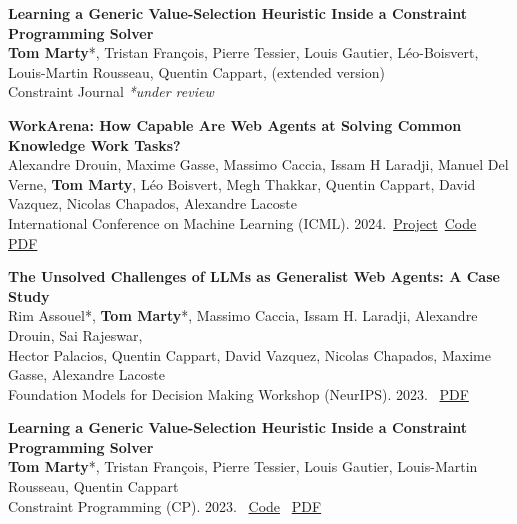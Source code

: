 \documentclass[letterpaper,11pt]{article}
\begin{document}
\begin{tcolorbox}[enhanced, sharp corners, colback=white, colframe=black!10!white, boxrule=0.5mm, left=10pt, right=10pt, top=6pt, bottom=3pt]
    \textbf{Learning a Generic Value-Selection Heuristic Inside a Constraint Programming Solver} \\
    \textbf{Tom Marty}*, Tristan François, Pierre Tessier, Louis Gautier, Léo-Boisvert, Louis-Martin Rousseau, Quentin Cappart, (extended version)\\
    Constraint Journal \hfill \textit{*under review} 
\end{tcolorbox}

\begin{tcolorbox}[enhanced, sharp corners, colback=white, colframe=black!10!white, boxrule=0.5mm, left=10pt, right=10pt, top=6pt, bottom=3pt]
    \textbf{WorkArena: How Capable Are Web Agents at Solving Common Knowledge Work Tasks?} \\
    Alexandre Drouin, Maxime Gasse, Massimo Caccia, Issam H Laradji, Manuel Del Verne, \textbf{Tom Marty}, Léo Boisvert, Megh Thakkar, Quentin Cappart, David Vazquez, Nicolas Chapados, Alexandre Lacoste \\
    International Conference on Machine Learning (ICML). 2024.  \hfill
\faLink \,\href{https://servicenow.github.io/WorkArena/}{Project}\quad \faCode\, \href{https://github.com/corail-research/SeaPearl.jl}{Code}\quad \faFilePdf \, \href{https://openreview.net/forum?id=jt3il4fC5B}{PDF}
\end{tcolorbox}

\begin{tcolorbox}[enhanced, sharp corners, colback=white, colframe=black!10!white, boxrule=0.5mm, left=10pt, right=10pt, top=6pt, bottom=3pt]
    \textbf{The Unsolved Challenges of LLMs as Generalist Web Agents: A Case Study} \\
    Rim Assouel*, \textbf{Tom Marty}*, Massimo Caccia, Issam H. Laradji, Alexandre Drouin, Sai Rajeswar,\\ Hector Palacios, Quentin Cappart, David Vazquez, Nicolas Chapados, Maxime Gasse, Alexandre Lacoste \\
    Foundation Models for Decision Making Workshop (NeurIPS). 2023. \hfill \faFilePdf \, \href{https://openreview.net/forum?id=jt3il4fC5B}{PDF}
\end{tcolorbox}

\begin{tcolorbox}[enhanced, sharp corners, colback=white, colframe=black!10!white, boxrule=0.5mm, left=10pt, right=10pt, top=6pt, bottom=3pt]
    \textbf{Learning a Generic Value-Selection Heuristic Inside a Constraint Programming Solver} \\
    \textbf{Tom Marty}*, Tristan François, Pierre Tessier, Louis Gautier, Louis-Martin Rousseau, Quentin Cappart \\
    Constraint Programming (CP). 2023. \hfill \faCode  \, \href{https://github.com/corail-research/SeaPearl.jl}{Code} \quad
    \faFilePdf \, \href{https://arxiv.org/abs/2301.01913}{PDF}
\end{tcolorbox}
\end{document}
